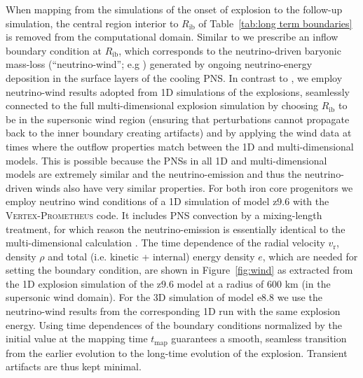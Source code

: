 \documentclass[fleqn,usenatbib]{mnras}
\newcommand{\vertexprom}{\textsc{Vertex-Prometheus}\xspace}
\newcommand{\onemg}{\ensuremath{\mathrm{e8.8}}\xspace}
\newcommand{\znine}{\ensuremath{\mathrm{z9.6}}\xspace}
\begin{document}
When mapping from the simulations of the onset of explosion to the follow-up simulation, the central region interior to $R_{\mathrm{ib}}$ of Table~\ref{tab:long term boundaries} is removed from the computational domain. Similar to \cite{Wongwathanarat2015} we prescribe an inflow boundary condition at $R_{\mathrm{ib}}$, which corresponds to the neutrino-driven baryonic mass-loss (``neutrino-wind''; e.g \citealt{Qian1996}) generated by ongoing neutrino-energy deposition in the surface layers of the cooling PNS. In contrast to \cite{Wongwathanarat2015}, we employ neutrino-wind results adopted from 1D simulations of the explosions, seamlessly connected to the full multi-dimensional explosion simulation by choosing $R_{\mathrm{ib}}$ to be in the supersonic wind region (ensuring that perturbations cannot propagate back to the inner boundary creating artifacts) and by applying the wind data at times
where the outflow properties match between the 1D and multi-dimensional models. This is possible because the PNSs in all 1D and multi-dimensional models are extremely similar and the neutrino-emission and thus the neutrino-driven winds also have very similar properties. 
For both iron core progenitors we employ neutrino wind conditions of a 1D simulation of model \znine with the \vertexprom code. It includes PNS convection by a mixing-length treatment, for which reason the neutrino-emission is essentially identical to the multi-dimensional calculation \citep{Mirizzi2016}. The time dependence of the radial velocity $v_{\mathrm{r}}$, density $\rho$ and total (i.e. kinetic + internal) energy density $e$, which are needed for setting the boundary condition, are shown in Figure~\ref{fig:wind} as extracted from the 1D explosion simulation of the \znine model at a radius of 600 km (in the supersonic wind domain).
For the 3D simulation of model \onemg we use the neutrino-wind results from the corresponding 1D run with the same explosion energy. Using time dependences of the boundary conditions normalized by the initial value at the mapping time $t_{\mathrm{map}}$  guarantees a smooth, seamless transition from the earlier evolution to the long-time evolution of the explosion. Transient artifacts are thus kept minimal.
\end{document}
